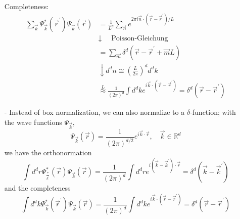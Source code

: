 \begin{itemize}
\begin{equation}
        \end{equation}
        Completeness:
        \begin{equation}
        \begin{aligned} \sum_{\vec{k}} \Psi_{\vec{k}}^{*}\left(\vec{r}^{\prime}\right) \Psi_{\vec{k}}(\vec{r}) &=\frac{1}{L^{d}} \sum_{\vec{n}} e^{2 \pi i \vec{n} \cdot\left(\vec{r}-\vec{r}^{\prime}\right) / L} \\ & \downarrow \quad \text { Poisson-Gleichung } \\ &=\sum_{\vec{m}} \delta^{d}\left(\vec{r}-\vec{r}^{\prime}+\vec{m} L\right) \\ & \downarrow d^{d} n \cong\left(\frac{L}{2 \pi}\right)^{d} d^{d} k \\ & \stackrel{L}{\approx} \frac{1}{(2 \pi)^{d}} \int d^{d} k e^{i \vec{k} \cdot\left(\vec{r}-\vec{r}^{\prime}\right)}=\delta^{d}\left(\vec{r}-\vec{r}^{\prime}\right) \end{aligned}
        \end{equation}
    \item[-] Instead of box normalization, we can also normalize to a $\delta$-function; with the wave functions $\Psi_{\vec{k}}$,
    \begin{equation}
        \Psi_{\vec{k}}(\vec{r})=\frac{1}{(2 \pi)^{d / 2}} e^{i \vec{k} \cdot \vec{r}}, \quad \vec{k} \in \mathbb{R}^{d}
        \end{equation}
    we have the orthonormation
    \begin{equation}
        \int d^{d} r \Psi_{\frac{*}{k^{\prime}}}^{*}(\vec{r}) \Psi_{\vec{k}}(\vec{r})=\frac{1}{(2 \pi)^{d}} \int d^{d} r e^{i\left(\vec{k}-\vec{k}^{\prime}\right) \cdot \vec{r}}=\delta^{d}\left(\vec{k}-\vec{k}^{\prime}\right)
        \end{equation}
    and the completeness
    \begin{equation}
        \int d^{d} k \Psi_{\vec{k}}^{*}\left(\vec{r}^{\prime}\right) \Psi_{\vec{k}}(\vec{r})=\frac{1}{(2 \pi)^{d}} \int d^{d} k e^{i \vec{k} \cdot\left(\vec{r}-\vec{r}^{\prime}\right)}=\delta^{d}\left(\vec{r}-\vec{r}^{\prime}\right)
        \end{equation}
\end{itemize}


